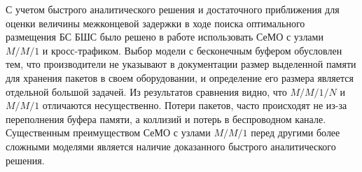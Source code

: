 



С учетом быстрого аналитического решения и достаточного приближения для оценки величины межконцевой задержки в ходе поиска оптимального размещения БС БШС было решено в работе использовать СеМО с узлами $M/M/1$ и кросс-трафиком. Выбор модели с бесконечным буфером обусловлен тем, что производители не указывают в документации размер выделенной памяти для хранения пакетов в своем оборудовании, и определение его размера является отдельной большой задачей. Из результатов сравнения видно, что $M/M/1/N$ и $M/M/1$ отличаются несущественно. Потери пакетов, часто происходят не из-за переполнения буфера памяти, а коллизий и потерь в беспроводном канале. Существенным преимуществом СеМО с узлами $M/M/1$ перед другими более сложными моделями является наличие доказанного быстрого аналитического решения.

